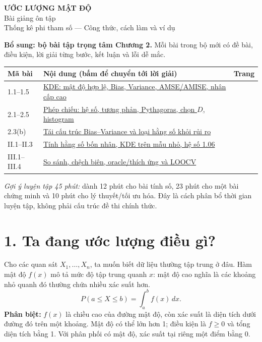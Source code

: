 \documentclass[11pt,a4paper]{article}
\begin{document}
\begin{center}
{\LARGE\bfseries ƯỚC LƯỢNG MẬT ĐỘ}\\[5pt]
{\Large Bài giảng ôn tập}\\[5pt]
{\normalsize Thống kê phi tham số — Công thức, cách làm và ví dụ}
\end{center}

\noindent\textbf{Bổ sung: bộ bài tập trọng tâm Chương 2.}
Mỗi bài trong bộ mới có đề bài, điều kiện, lời giải từng bước, kết luận và lỗi dễ mắc.
\begin{center}
\small
\begin{tabular}{p{}p{}r}
\toprule Mã bài & Nội dung (bấm để chuyển tới lời giải) & Trang\\\midrule
1.1--1.5 & \hyperref[ot45:kde-density]{KDE: mật độ hợp lệ, Bias, Variance, AMSE/AMISE, nhân cấp cao} & \pageref{ot45:kde-density}\\
2.1--2.5 & \hyperref[ot45:projection-coeff]{Phép chiếu: hệ số, tương phản, Pythagoras, chọn $D$, histogram} & \pageref{ot45:projection-coeff}\\
2.3(b) & \hyperref[ot45:risk-reformulation]{Tái cấu trúc Bias--Variance và loại hằng số khỏi rủi ro} & \pageref{ot45:risk-reformulation}\\
II.1--II.3 & \hyperref[ot45:constants]{Tính hằng số bốn nhân, KDE trên mẫu nhỏ, hệ số 1.06} & \pageref{ot45:constants}\\
III.1--III.4 & \hyperref[ot45:comparison]{So sánh, chệch biên, oracle/thích ứng và LOOCV} & \pageref{ot45:comparison}\\
\bottomrule
\end{tabular}
\end{center}
\textit{Gợi ý luyện tập 45 phút:} dành 12 phút cho bài tính số, 23 phút cho một bài chứng minh và 10 phút cho lý thuyết/tối ưu hóa. Đây là cách phân bổ thời gian luyện tập, không phải cấu trúc đề thi chính thức.

\section*{1. Ta đang ước lượng điều gì?}
Cho các quan sát $X_1,\ldots,X_n$, ta muốn biết dữ liệu thường tập trung ở đâu. Hàm mật độ $f(x)$ mô tả mức độ tập trung quanh $x$: mật độ cao nghĩa là các khoảng nhỏ quanh đó thường chứa nhiều xác suất hơn.
\[
P(a\leq X\leq b)=\int_a^b f(x)\,dx.
\]
\textbf{Phân biệt:} $f(x)$ là chiều cao của đường mật độ, còn xác suất là diện tích dưới đường đó trên một khoảng. Mật độ có thể lớn hơn 1; điều kiện là $f\geq0$ và tổng diện tích bằng 1. Với phân phối có mật độ, xác suất tại riêng một điểm bằng 0.
\end{document}
